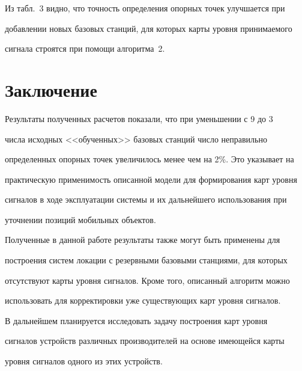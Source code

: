  Из табл.~3 видно, что точность определения опорных точек улучшается при

добавлении новых базовых станций, для которых карты уровня принимаемого

сигнала строятся при помощи алгоритма~2.



 \section{Заключение}



 Результаты полученных расчетов показали, что при уменьшении с 9 до 3

числа исходных <<обученных>> базовых станций число неправильно

определенных опорных точек увеличилось менее чем на 2\%. Это указывает на

практическую применимость описанной модели для формирования карт уровня

сигналов в ходе эксплуатации системы и их дальнейшего использования при

уточнении позиций мобильных объектов.



 Полученные в данной работе результаты также могут быть применены для

построения систем локации с резервными базовыми станциями, для которых

отсутствуют карты уровня сигналов. Кроме того, описанный алгоритм можно

использовать для корректировки уже существующих карт уровня сигналов.



 В дальнейшем планируется исследовать задачу построения карт уровня

сигналов устройств различных производителей на основе имеющейся карты

уровня сигналов одного из этих устройств.



